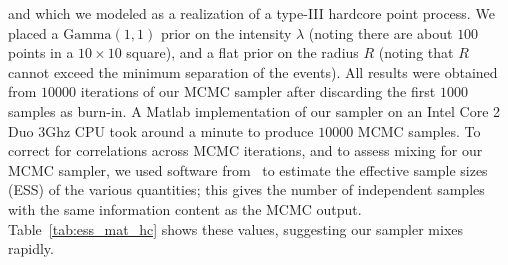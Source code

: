 \documentclass{statsoc}
\begin{document}
and which we modeled as a realization of a \matern type-III hardcore point process. 
We placed a $\text{Gamma}(1,1)$ prior on the intensity $\lambda$ (noting there are about $100$ points in a $10\times10$ square), and a flat prior on 
the radius $R$ (noting that $R$ cannot exceed the minimum separation of the \matern events). 
All results were obtained from $10000$ iterations of our MCMC sampler after discarding the first
$1000$ samples as burn-in. 
A Matlab implementation of our sampler 
on an Intel Core 2 Duo $3$Ghz CPU took around a minute to produce $10000$ MCMC samples.
To correct for correlations across MCMC iterations, and to assess mixing for our MCMC sampler, we used software from~\cite{Rcoda2006} to
estimate the effective sample sizes (ESS) of the various quantities; this gives the number of independent samples with the same information content as
the MCMC output.
Table~\ref{tab:ess_mat_hc} shows these values, suggesting our sampler mixes rapidly.
\end{document}
